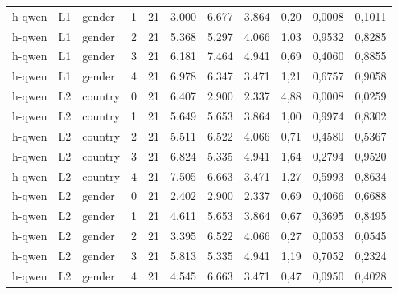 \begin{landscape}
\begin{longtable}{lllrrrrrrrr}
h-qwen & L1 & gender & 1 & 21 & 3.000 & 6.677 & 3.864 & 0,20 & 0,0008 & 0,1011 \\
h-qwen & L1 & gender & 2 & 21 & 5.368 & 5.297 & 4.066 & 1,03 & 0,9532 & 0,8285 \\
h-qwen & L1 & gender & 3 & 21 & 6.181 & 7.464 & 4.941 & 0,69 & 0,4060 & 0,8855 \\
h-qwen & L1 & gender & 4 & 21 & 6.978 & 6.347 & 3.471 & 1,21 & 0,6757 & 0,9058 \\
h-qwen & L2 & country & 0 & 21 & 6.407 & 2.900 & 2.337 & 4,88 & 0,0008 & 0,0259 \\
h-qwen & L2 & country & 1 & 21 & 5.649 & 5.653 & 3.864 & 1,00 & 0,9974 & 0,8302 \\
h-qwen & L2 & country & 2 & 21 & 5.511 & 6.522 & 4.066 & 0,71 & 0,4580 & 0,5367 \\
h-qwen & L2 & country & 3 & 21 & 6.824 & 5.335 & 4.941 & 1,64 & 0,2794 & 0,9520 \\
h-qwen & L2 & country & 4 & 21 & 7.505 & 6.663 & 3.471 & 1,27 & 0,5993 & 0,8634 \\
h-qwen & L2 & gender & 0 & 21 & 2.402 & 2.900 & 2.337 & 0,69 & 0,4066 & 0,6688 \\
h-qwen & L2 & gender & 1 & 21 & 4.611 & 5.653 & 3.864 & 0,67 & 0,3695 & 0,8495 \\
h-qwen & L2 & gender & 2 & 21 & 3.395 & 6.522 & 4.066 & 0,27 & 0,0053 & 0,0545 \\
h-qwen & L2 & gender & 3 & 21 & 5.813 & 5.335 & 4.941 & 1,19 & 0,7052 & 0,2324 \\
h-qwen & L2 & gender & 4 & 21 & 4.545 & 6.663 & 3.471 & 0,47 & 0,0950 & 0,4028 \\
\end{longtable}
\end{landscape}
